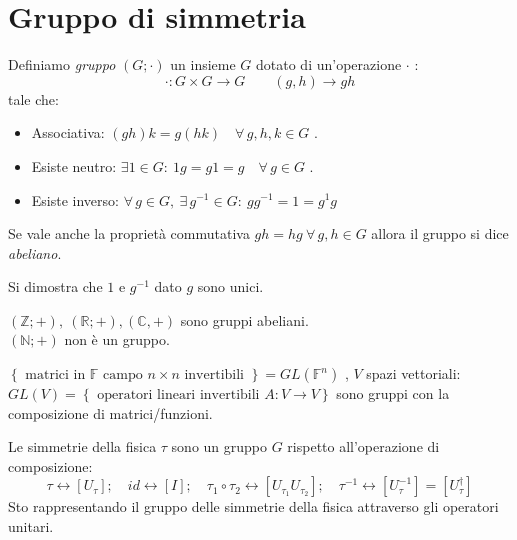 \section{Gruppo di simmetria}
\begin{definition}
    Definiamo \textit{gruppo} \((G; \cdot )\) un insieme \(G\) dotato di un'operazione \(\cdot \) :
    \begin{equation}
        \cdot : G \times G \to G \qquad (g,h)\to gh
    \end{equation}
    tale che:
    \begin{itemize}
        \item Associativa: \((gh)k= g(hk) \quad \forall\, g,h,k \in G\) .
        \item Esiste neutro: \(\exists 1 \in G :\ 1g = g1 = g \quad \forall \, g \in G\) .
        \item Esiste inverso: \(\forall \, g \in G , \ \exists\, g^{-1}\in G : \ gg^{-1}= 1 = g^{1}g\)
    \end{itemize}
\end{definition}
Se vale anche la proprietà commutativa \(gh = hg \ \forall\, g,h \in G\) allora il gruppo si dice \textit{abeliano}.
\begin{remark}
    Si dimostra che \(1\) e \(g^{-1}\) dato \(g\) sono unici.
\end{remark}

\begin{example}
    \((\mathbb{Z}; + ), \ (\mathbb{R}; +), (\mathbb{C}, +)\) sono gruppi abeliani. \\
    \((\mathbb{N}; +)\) non è un gruppo.
\end{example}
\begin{example}
    \(\left\{ \text{ matrici in } \mathbb{F} \text{ campo } n\times n \text{ invertibili } \right\}= GL(\mathbb{F}^n)\) , 
    \(V\) spazi vettoriali: \(GL(V)= \left\{ \text{ operatori lineari invertibili } A: V\to V\right\}\) sono gruppi con la composizione di matrici/funzioni.
\end{example}

Le simmetrie della fisica \(\tau\) sono un gruppo \(G\) rispetto all'operazione di composizione:
\[
    \tau \leftrightarrow \left[ U_\tau \right]; \quad id \leftrightarrow \left[ I \right]  ;\quad \tau_1\circ \tau_2 \leftrightarrow \left[ U_{\tau_1} U_{\tau_2} \right]; \quad
    \tau^{-1}\leftrightarrow \left[ U^{-1}_\tau \right] = \left[ U^\dagger _\tau \right]
\]
Sto rappresentando il gruppo delle simmetrie della fisica attraverso gli operatori unitari.

